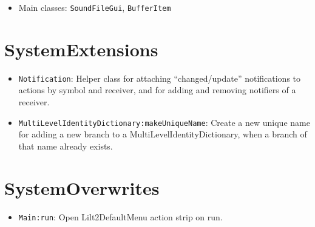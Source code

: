 \documentclass[11pt, a4paper]{scrartcl}
\begin{document}
\begin{itemize}
\item Main classes: \texttt{SoundFileGui}, \texttt{BufferItem}
\end{itemize}
\section{SystemExtensions}
\label{sec-9}


\begin{itemize}
\item \texttt{Notification}: Helper class for attaching ``changed/update'' notifications to actions by symbol and receiver, and for adding and removing notifiers of a receiver.
\item \texttt{MultiLevelIdentityDictionary:makeUniqueName}: Create a new unique name for adding a new branch to a MultiLevelIdentityDictionary, when a branch of that name already exists.
\end{itemize}
\section{SystemOverwrites}
\label{sec-10}


\begin{itemize}
\item \texttt{Main:run}: Open Lilt2DefaultMenu action strip on run.
\end{itemize}
\end{document}
